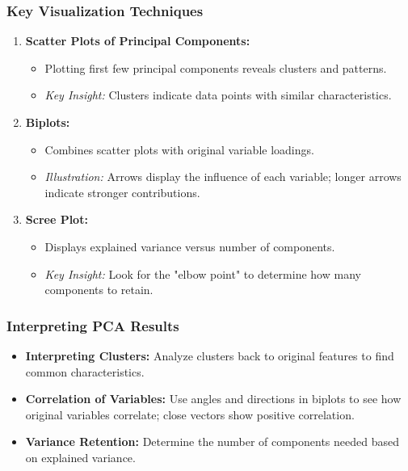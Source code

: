 \documentclass[aspectratio=169]{beamer}
\begin{document}
\begin{frame}[fragile]
    \frametitle{Key Visualization Techniques}
    
    \begin{enumerate}
        \item \textbf{Scatter Plots of Principal Components:}
        \begin{itemize}
            \item Plotting first few principal components reveals clusters and patterns.
            \item \textit{Key Insight:} Clusters indicate data points with similar characteristics.
        \end{itemize}

        \item \textbf{Biplots:}
        \begin{itemize}
            \item Combines scatter plots with original variable loadings.
            \item \textit{Illustration:} Arrows display the influence of each variable; longer arrows indicate stronger contributions.
        \end{itemize}

        \item \textbf{Scree Plot:}
        \begin{itemize}
            \item Displays explained variance versus number of components.
            \item \textit{Key Insight:} Look for the "elbow point" to determine how many components to retain.
        \end{itemize}
    \end{enumerate}
\end{frame}

\begin{frame}[fragile]
    \frametitle{Interpreting PCA Results}
    \begin{itemize}
        \item \textbf{Interpreting Clusters:} Analyze clusters back to original features to find common characteristics.
        \item \textbf{Correlation of Variables:} Use angles and directions in biplots to see how original variables correlate; close vectors show positive correlation.
        \item \textbf{Variance Retention:} Determine the number of components needed based on explained variance.
    \end{itemize}
\end{frame}
\end{document}
